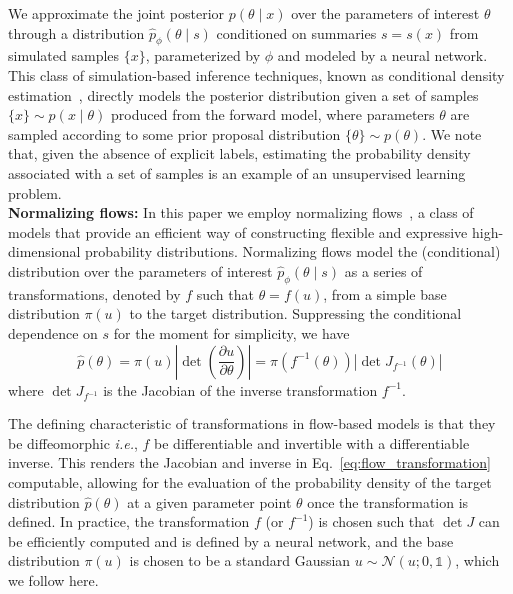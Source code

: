 \documentclass[prd,aps,10pt,nofootinbib,twocolumn,superscriptaddress,preprintnumbers,balancelastpage,longbibliography]{revtex4-1}
\begin{document}
We approximate the joint posterior $p(\theta\mid x)$ over the parameters of interest $\theta$ through a distribution $\hat p_\phi(\theta\mid s)$ conditioned on summaries $s=s(x)$ from simulated samples $\{x\}$, parameterized by $\phi$ and modeled by a neural network. This class of simulation-based inference techniques, known as conditional density estimation~\cite{papamakariosFastEpsilonFree2018,cranmer_kyle_2016_198541}, directly models the posterior distribution given a set of samples $\{x\}\sim p(x\mid\theta)$ produced from the forward model, where parameters $\theta$ are sampled according to some prior proposal distribution $\{\theta\}\sim p(\theta)$. We note that, given the absence of explicit labels, estimating the probability density associated with a set of samples is an example of an unsupervised learning problem. \\

\noindent
\textbf{Normalizing flows:}
In this paper we employ normalizing flows~\cite{papamakarios2019normalizing,rezende2015variational}, a class of models that provide an efficient way of constructing flexible and expressive high-dimensional probability distributions. Normalizing flows model the (conditional) distribution over the parameters of interest $\hat p_\phi(\theta\mid s)$ as a series of transformations, denoted by $f$ such that $\theta = f(u)$, from a simple base distribution $\pi({u})$ to the target distribution. Suppressing the conditional dependence on $s$ for the moment for simplicity, we have
\begin{equation}
\label{eq:flow_transformation}
\hat{p}({\theta})=\pi(u)\left|\operatorname{det}\left(\frac{\partial u}{\partial {\theta}}\right)\right|=\pi(f^{-1}({\theta}))\left|\operatorname{det}J_{f^{-1}}(\theta)\right|
\end{equation}
where $\operatorname{det}J_{f^{-1}}$ is the Jacobian of the inverse transformation $f^{-1}$.

The defining characteristic of transformations in flow-based models is that they be diffeomorphic \emph{i.e.}, $f$ be differentiable and invertible with a differentiable inverse. This renders the Jacobian and inverse in Eq.~\eqref{eq:flow_transformation} computable, allowing for the evaluation of the probability density of the target distribution $\hat{p}({\theta})$ at a given parameter point $\theta$ once the transformation is defined. In practice, the transformation $f$ (or $f^{-1}$) is chosen such that $\operatorname{det}J$ can be efficiently computed and is defined by a neural network, and the base distribution $\pi(u)$ is chosen to be a standard Gaussian $u\sim \mathcal N(u; 0, \mathbb{1})$, which we follow here. 
\end{document}

